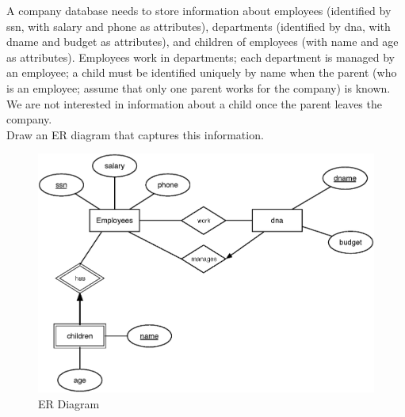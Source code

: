 \begin{problem}{2.4}

  A company database needs to store information about employees (identified by ssn, with salary and phone as
  attributes), departments (identified by dna, with dname and budget as attributes), and children of employees (with
  name and age as attributes). Employees work in departments; each department is managed by an employee; a child must be
  identified uniquely by name when the parent (who is an employee; assume that only one parent works for the company) is
  known. We are not interested in information about a child once the parent leaves the company. \\

  \noindent Draw an ER diagram that captures this information.

  \begin{solution}
    \begin{figure}[H]
      \centering
      \caption{ER Diagram}
      \includegraphics[scale=.5]{2_4.eps}
    \end{figure}
  \end{solution}
\end{problem}

